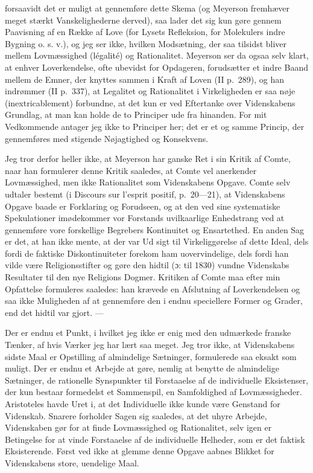 \documentclass[12pt]{article}
\newcommand{\opage}[1]{\marginnote{\footnotesize\textit{[#1]}}}
\begin{document}
forsaavidt det er muligt at gennemføre dette Skema (og Meyerson
fremhæver meget stærkt Vanskelighederne derved), saa lader det sig kun
gøre gennem Paavisning af en Række af Love (for Lysets Refleksion, for
Molekulers indre Bygning o. s. v.), og jeg ser ikke, hvilken Modsætning,
der saa tilsidst bliver mellem \guillemotright
Lovmæssighed\guillemotleft{} (légalité) og \guillemotright
Rationalitet\guillemotleft . Meyerson ser da ogsaa selv klart, at enhver
Loverkendelse, ofte ubevidst for Opdageren, forudsætter et indre Baand
mellem de Emner, der knyttes sammen i Kraft af Loven (II p.~289), og han
indrømmer (II p.~337), at Legalitet og Rationalitet i Virkeligheden er
saa nøje (inextricablement) forbundne, at det kun er ved Eftertanke over
Videnskabens Grundlag, at man kan holde de to Principer ude fra
hinanden. For mit Vedkommende antager jeg ikke to Principer her; det er
et og samme Princip, der gennemføres med stigende Nøjagtighed og
Konsekvens.

Jeg tror derfor heller ikke, at Meyerson har ganske Ret i sin Kritik af
Comte, naar han formulerer denne Kritik saaledes, at Comte vel anerkender
Lovmæssighed, men ikke Rationalitet som Videnskabens Opgave. Comte selv
udtaler bestemt (i Discours sur l'esprit positif, p.~20---21), at
Videnskabens Opgave baade er Forklaring og Forudseen, og at den
\guillemotright ved sine systematiske Spekulationer imødekommer vor
Forstands uvilkaarlige Enhedstrang ved at gennemføre vore forskellige
Begrebers Kontinuitet og Ensartethed\guillemotleft . En anden Sag er
det, at han ikke mente, at der var Ud%
\opage{55}%
sigt til Virkeliggørelse af dette Ideal, dels fordi de faktiske
Diskontinuiteter forekom ham uovervindelige, dels fordi han vilde være
Religionsstifter og gøre den hidtil (ɔ: til 1830) vundne Videnskabs
Resultater til den nye Religions Dogmer. Kritiken af Comte maa efter min
Opfattelse formuleres saaledes: han krævede en Afslutning af
Loverkendelsen og saa ikke Muligheden af at gennemføre den i endnu
speciellere Former og Grader, end det hidtil var gjort. ---

Der er endnu et Punkt, i hvilket jeg ikke er enig med den udmærkede
franske Tænker, af hvis Værker jeg har lært saa meget. Jeg tror ikke, at
Videnskabens sidste Maal er Opstilling af almindelige Sætninger,
formulerede saa eksakt som muligt. Der er endnu et Arbejde at gøre,
nemlig at benytte de almindelige Sætninger, de rationelle Synspunkter til
Forstaaelse af de individuelle Eksistenser, der kun bestaar formedelst et
Sammenspil, en Samfoldighed af Lovmæssigheder. Aristoteles havde Uret i,
at det Individuelle ikke kunde være Genstand for Videnskab. Snarere
forholder Sagen sig saaledes, at det uhyre Arbejde, Videnskaben gør for
at finde Lovmæssighed og Rationalitet, selv igen er Betingelse for at
vinde Forstaaelse af de individuelle Helheder, som er det faktisk
Eksisterende. Først ved ikke at glemme denne Opgave aabnes Blikket for
Videnskabens store, uendelige Maal.
\end{document}
